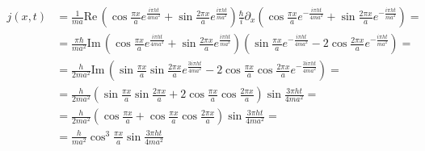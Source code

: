 \documentclass[a4paper,12pt]{article}
\newcommand{\kla}{}
\begin{document}
\begin{align*}
j(x,t)&=\frac{1}{ma}\mathrm{Re}\,\kla\left( {\cos\frac{\pi x}{a}e^{\frac{i\pi ht}{4ma^2}}+\sin\frac{2\pi x}{a}e^{\frac{i\pi ht}{ma^2}}} \right)\frac{\hbar}{i}\partial_x\kla\left( {\cos\frac{\pi x}{a}e^{-\frac{i\pi ht}{4ma^2}}+\sin\frac{2\pi x}{a}e^{-\frac{i\pi ht}{ma^2}}} \right)= \\
&=\frac{\pi\hbar}{ma^2}\mathrm{Im}\,\kla\left( {\cos\frac{\pi x}{a}e^{\frac{i\pi ht}{4ma^2}}+\sin\frac{2\pi x}{a}e^{\frac{i\pi ht}{ma^2}}} \right)\kla\left( {\sin\frac{\pi x}{a}e^{-\frac{i\pi ht}{4ma^2}}-2\cos\frac{2\pi x}{a}e^{-\frac{i\pi ht}{ma^2}}} \right)= \\
&=\frac{h}{2ma^2}\mathrm{Im}\,\kla\left( {\sin\frac{\pi x}{a}\sin\frac{2\pi x}{a}e^{\frac{3i\pi ht}{4ma^2}}-2\cos\frac{\pi x}{a}\cos\frac{2\pi x}{a}e^{-\frac{3i\pi ht}{4ma^2}}} \right)= \\
&=\frac{h}{2ma^2}\kla\left( {\sin\frac{\pi x}{a}\sin\frac{2\pi x}{a}+2\cos\frac{\pi x}{a}\cos\frac{2\pi x}{a}} \right)\sin{\frac{3\pi ht}{4ma^2}} =\\
&=\frac{h}{2ma^2}\kla\left( {\cos\frac{\pi x}{a}+\cos\frac{\pi x}{a}\cos\frac{2\pi x}{a}} \right) \sin{\frac{3\pi ht}{4ma^2}}=\\
&=\frac{h}{ma^2}\cos^3\frac{\pi x}{a}\sin{\frac{3\pi ht}{4ma^2}}
\end{align*}
\end{document}
